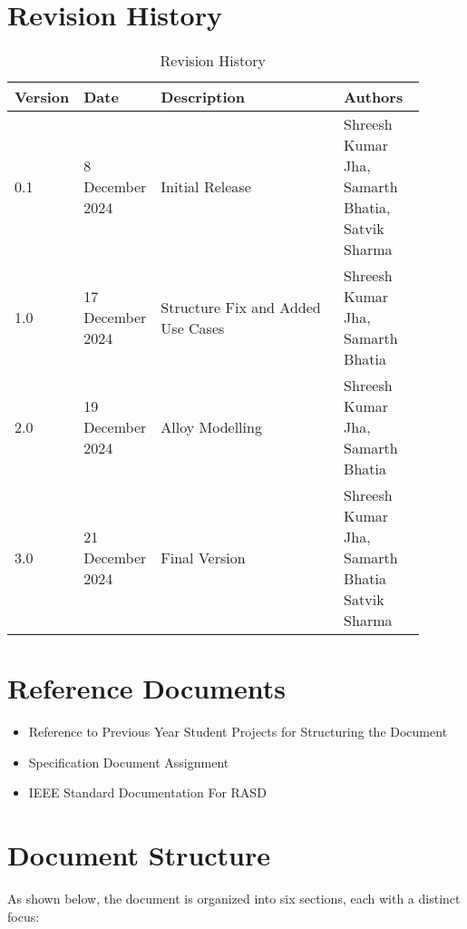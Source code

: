 \section{Revision History}
\label{sec:revision_history}

\begin{table}[H]
    \centering
    \begin{tabular}{ |p{0.1\linewidth}|p{0.15\linewidth}|p{0.45\linewidth}|p{0.2\linewidth}| }
        \hline
        \textbf{Version} & \textbf{Date} & \textbf{Description} & \textbf{Authors} \\
        \hline
        0.1 & 8 December 2024 & Initial Release & 
        Shreesh Kumar Jha, \newline
        Samarth Bhatia, \newline
        Satvik Sharma \\
        \hline
        1.0 & 17 December 2024 & Structure Fix and Added Use Cases & 
        Shreesh Kumar Jha, \newline
        Samarth Bhatia \\
        \hline
        2.0 & 19 December 2024 & Alloy Modelling & 
        Shreesh Kumar Jha, \newline
        Samarth Bhatia \\
        \hline
        3.0 & 21 December 2024 & Final Version & 
        Shreesh Kumar Jha, \newline
        Samarth Bhatia \newline
        Satvik Sharma\\
        \hline
    \end{tabular}
    \caption{Revision History}
    \label{tab:revision_history}
\end{table}


\section{Reference Documents}
\label{sec:reference_documents}%
\begin{itemize}
    \item Reference to Previous Year Student Projects for Structuring the Document
    \item Specification Document Assignment
    \item IEEE Standard Documentation For RASD 
\end{itemize}

\newpage

\section{Document Structure}
\label{sec:document_structure}%
As shown below, the document is organized into six sections, each with a distinct focus:

